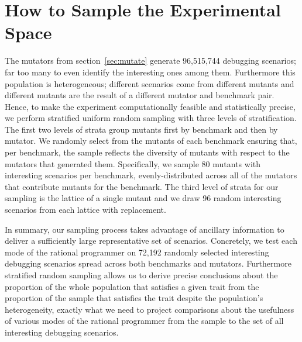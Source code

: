 \section{How to Sample the Experimental Space} 

The mutators from section~\ref{sec:mutate} generate 96,515,744 debugging
scenarios; far too many to even identify the interesting ones among them.
Furthermore this population is heterogeneous; different scenarios come
from different mutants and different mutants are the result of a
different mutator and benchmark pair. Hence, to make the experiment
computationally feasible and statistically precise, we perform stratified
uniform random sampling with three levels of stratification.  The first
two levels of strata group mutants first by benchmark and then by mutator. 
We randomly select from the mutants of
each benchmark ensuring that, per
benchmark, the sample reflects the diversity of mutants with respect to
the mutators that generated them.  Specifically,  we sample 80 mutants
with interesting scenarios per benchmark,  evenly-distributed across all
of the mutators that contribute mutants for the benchmark.  The third
level of strata for our sampling is the lattice of a single mutant and we draw 96 random
interesting scenarios from each lattice with replacement.

In summary, our sampling process takes advantage of ancillary information
to deliver a  sufficiently large representative set of scenarios.
Concretely, we test each
mode of the rational programmer on 72,192 randomly selected interesting
debugging scenarios spread across both benchmarks and mutators.
Furthermore stratified random sampling allows us to derive precise conclusions
about the proportion of the whole population that satisfies a given trait 
from the proportion of the sample 
that satisfies the trait despite the population's heterogeneity, exactly what we need to project comparisons about the
usefulness of various modes of the
rational programmer from the sample to the set of all interesting debugging
scenarios.  
 



